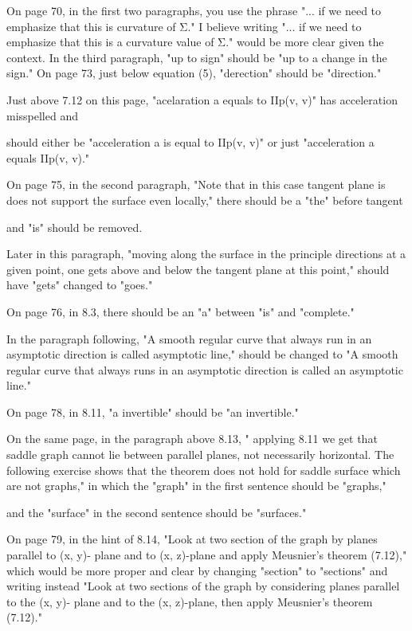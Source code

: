  On page 70, in the first two paragraphs, you use the phrase "... if we need to emphasize that this is curvature of Σ." I believe writing "... if we need to emphasize that this is a curvature value of Σ." would be more clear given the context.  In the third paragraph, "up to sign" should be "up to a change in the sign." On page 73, just below equation (5), "derection" should be "direction." 
 
 Just above 7.12 on this page, "acelaration a equals to IIp(v, v)" has acceleration misspelled and 
 
 should either be "acceleration a is equal to IIp(v, v)" or just "acceleration a equals IIp(v, v)." 
 
 On page 75, in the second paragraph, "Note that in this case tangent plane is does not support the surface even locally," there should be a "the" before tangent 
 
 and "is" should be removed. 
 
 Later in this paragraph, "moving along the surface in the principle directions at a given point, one gets above and below the tangent plane at this point," should have "gets" changed to "goes." 
 
 On page 76, in 8.3, there should be an "a" between "is" and "complete." 
 
 In the paragraph following, "A smooth regular curve that always run in an asymptotic direction is called asymptotic line," should be changed to "A smooth regular curve that always runs in an asymptotic direction is called an asymptotic line." 
 
 On page 78, in 8.11, "a invertible" should be "an invertible." 
 
 On the same page, in the paragraph above 8.13, " applying 8.11 we get that saddle graph cannot lie between parallel planes, not necessarily horizontal. The following exercise shows that the theorem does not hold for saddle surface which are not graphs," in which the "graph" in the first sentence should be "graphs," 
 
 and the "surface" in the second sentence should be "surfaces." 
 
 On page 79, in the hint of 8.14, "Look at two section of the graph by planes parallel to (x, y)- plane and to (x, z)-plane and apply Meusnier’s theorem (7.12)," which would be more proper and clear by changing "section" to "sections" and writing instead "Look at two sections of the graph by considering planes parallel to the (x, y)- plane and to the (x, z)-plane, then apply Meusnier’s theorem (7.12)." 
 
